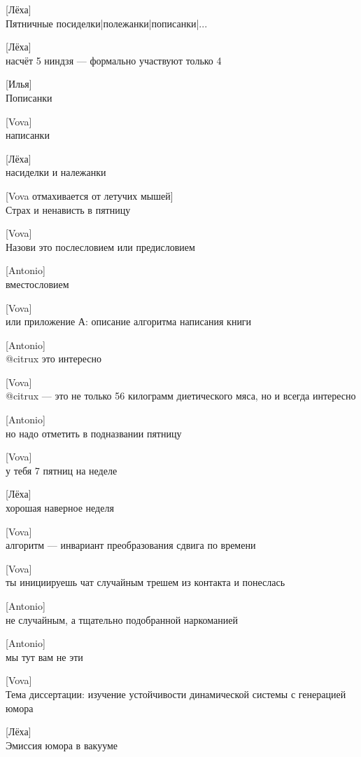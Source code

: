 [Лёха]\\
Пятничные посиделки|полежанки|пописанки|...


[Лёха]\\
насчёт 5 ниндзя — формально участвуют только 4


[Илья]\\
Пописанки


[Vova]\\
написанки


[Лёха]\\
насиделки и належанки


[Vova отмахивается от летучих мышей]\\
Страх и ненависть в пятницу


[Vova]\\
Назови это послесловием
или предисловием


[Antonio]\\
вместословием


[Vova]\\
или приложение А: описание алгоритма написания книги


[Antonio]\\
@citrux это интересно


[Vova]\\
@citrux — это не только 56 килограмм диетического мяса, но и всегда интересно


[Antonio]\\
но надо отметить в подназвании пятницу


[Vova]\\
у тебя 7 пятниц на неделе


[Лёха]\\
хорошая наверное неделя


[Vova]\\
алгоритм — инвариант преобразования сдвига по времени


[Vova]\\
ты инициируешь чат случайным трешем из контакта и понеслась


[Antonio]\\
не случайным, а тщательно подобранной наркоманией


[Antonio]\\
мы тут вам не эти


[Vova]\\
Тема диссертации: изучение устойчивости динамической системы с генерацией юмора


[Лёха]\\
Эмиссия юмора в вакууме


